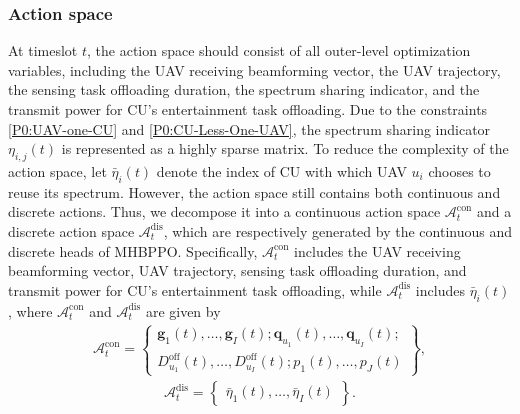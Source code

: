 \documentclass[10pt,journal,compsoc]{IEEEtran}
\begin{document}
\subsubsection{Action space}
At timeslot $t$, the action space should consist of all outer-level optimization variables, including the UAV receiving beamforming vector, the UAV trajectory, the sensing task offloading duration, the spectrum sharing indicator, and the transmit power for CU's entertainment task offloading. 
Due to the constraints \eqref{P0:UAV-one-CU} and \eqref{P0:CU-Less-One-UAV}, the spectrum sharing indicator $\eta_{i, j}(t)$ is represented as a highly sparse matrix. 
To reduce the complexity of the action space, let $\bar{\eta}_{i}(t)$ denote the index of CU with which UAV $u_{i}$ chooses to reuse its spectrum. 
However, the action space still contains both continuous and discrete actions.
Thus, we decompose it into a continuous action space $\mathcal{A}^{\text{con}}_{t}$ and a discrete action space $\mathcal{A}^{\text{dis}}_{t}$,
which are respectively generated by the continuous and discrete heads of MHBPPO.
Specifically, $\mathcal{A}^{\text{con}}_{t}$ includes the UAV receiving beamforming vector, UAV trajectory, sensing task offloading duration, and transmit power for CU's entertainment task offloading, while $\mathcal{A}^{\text{dis}}_{t}$ includes $\bar{\eta}_{i}(t)$,
where $\mathcal{A}^{\text{con}}_{t}$ and $\mathcal{A}^{\text{dis}}_{t}$ are given by
\begin{align}\label{c5:Action-Continuous-Sapce}
    \mathcal{A}^{\text{con}}_{t} = 
    \begin{Bmatrix}
        \bm{g}_{1}(t), \dots, \bm{g}_{I}(t);\bm{q}_{u_{1}}(t), \dots, \bm{q}_{u_{I}}(t); \\
        D_{u_{1}}^{\text{off}}(t), \dots, D_{u_{I}}^{\text{off}}(t);  p_{1}(t), \dots, p_{J}(t)
    \end{Bmatrix},
\end{align}
\begin{align}\label{c5:Action-Discrete-Sapce}
    \mathcal{A}^{\text{dis}}_{t} = 
    \begin{Bmatrix}
        \bar{\eta}_{1}(t), \dots, \bar{\eta}_{I}(t)
    \end{Bmatrix}.
\end{align}
\end{document}
